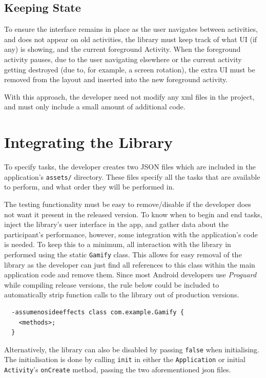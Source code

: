 \subsection{Keeping State}

To ensure the interface remains in place as the user navigates
between activities, and does not appear on old activities, the
library must keep track of what UI (if any) is showing, and 
the current foreground Activity. When the foreground activity
pauses, due to the user navigating elsewhere or the current
activity getting destroyed (due to, for example, a screen
rotation), the extra UI must be removed from the layout and 
inserted into the new foreground activity.

With this approach, the developer need not modify any xml files
in the project, and must only include a small amount of additional
code.

\section{Integrating the Library}

To specify tasks, the developer creates two JSON files which are
included in the application's \verb+assets/+ directory. These files
specify all the tasks that are available to perform, and what order
they will be performed in.

The testing functionality must be easy to remove/disable if the
developer does not want it present in the released version. To know
when to begin and end tasks, inject the library's user interface
in the app, and gather data about the participant's performance,
however, some integration with the application's code is needed.
To keep this to a minimum, all interaction with the library in
performed using the static \verb/Gamify/ class. This allows for
easy removal of the library as the developer can just find all
references to this class within the main application code and remove
them. Since most Android developers use \emph{Proguard} while
compiling release versions, the rule below could be included to
automatically strip function calls to the library out of production
versions.

\begin{verbatim}
  -assumenosideeffects class com.example.Gamify {
    <methods>;
  }
\end{verbatim}

Alternatively, the library can also be disabled by passing \verb|false|
when initialising. The initialisation is done by calling \verb|init|
in either the \verb|Application| or initial \verb|Activity|'s
\verb|onCreate| method, passing the two aforementioned json files.

